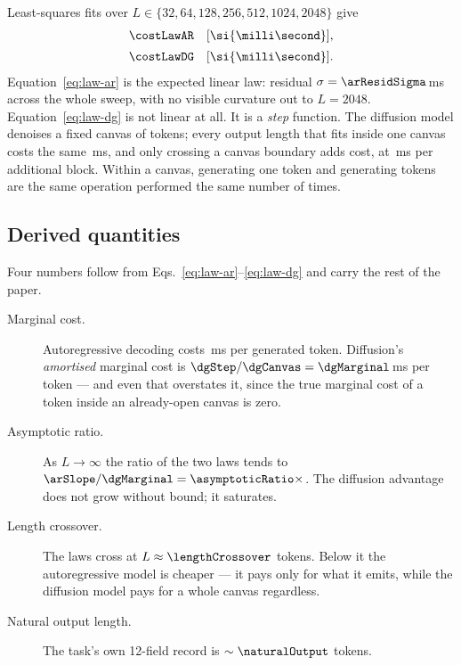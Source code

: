 Least-squares fits over $L \in \{32,64,128,256,512,1024,2048\}$ give
%
\begin{align}
  \costLawAR \quad [\si{\milli\second}],
  \label{eq:law-ar}\\[2pt]
  \costLawDG \quad [\si{\milli\second}].
  \label{eq:law-dg}
\end{align}
%
Equation~\eqref{eq:law-ar} is the expected linear law: residual
$\sigma = \arResidSigma$\,ms across the whole sweep, with no visible curvature
out to $L=2048$. Equation~\eqref{eq:law-dg} is not linear at all. It is a
\emph{step} function. The diffusion model denoises a fixed canvas of
\dgCanvas{} tokens; every output length that fits inside one canvas costs the
same \dgBase{}\,ms, and only crossing a canvas boundary adds cost, at
\dgStep{}\,ms per additional block. Within a canvas, generating one token and
generating \dgCanvas{} tokens are the same operation performed the same number
of times.


\subsection{Derived quantities}
\label{sec:cost-laws:derived}

Four numbers follow from Eqs.~\eqref{eq:law-ar}--\eqref{eq:law-dg} and carry the
rest of the paper.

\begin{description}
  \item[Marginal cost.] Autoregressive decoding costs \arSlope{}\,ms per
    generated token. Diffusion's \emph{amortised} marginal cost is
    $\dgStep/\dgCanvas = \dgMarginal$\,ms per token --- and even that overstates
    it, since the true marginal cost of a token inside an already-open canvas is
    zero.
  \item[Asymptotic ratio.] As $L \to \infty$ the ratio of the two laws tends to
    $\arSlope/\dgMarginal = \asymptoticRatio\times$. The diffusion advantage
    does not grow without bound; it saturates.
  \item[Length crossover.] The laws cross at $L \approx \lengthCrossover$
    tokens. Below it the autoregressive model is cheaper --- it pays only for
    what it emits, while the diffusion model pays for a whole canvas regardless.
  \item[Natural output length.] The task's own 12-field record is
    $\sim\naturalOutput$ tokens.
\end{description}

